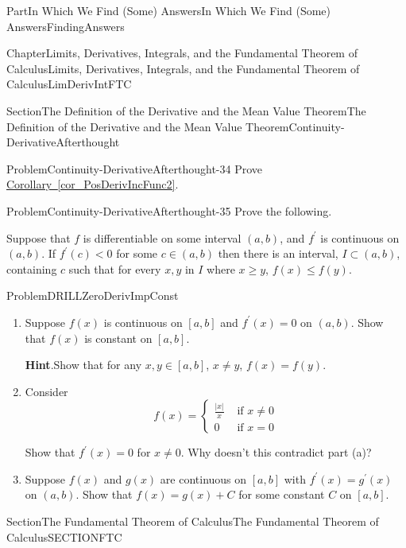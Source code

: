 \documentclass[oneside,10pt,]{book}
\newcommand{\blocktitlefont}{\relax}
\newcommand{\xreffont}{\relax}
\numberwithin{equation}{part}
\newcommand{\abs}[1]{\left|#1\right|}
\newcommand{\lt}{<}
\newcommand{\amp}{&}
\begin{document}
\begin{partptx}{Part}{In Which We Find (Some) Answers}{}{In Which We Find (Some) Answers}{}{}{FindingAnswers}
\begin{chapterptx}{Chapter}{Limits, Derivatives, Integrals, and the Fundamental Theorem of Calculus}{}{Limits, Derivatives, Integrals, and the Fundamental Theorem of Calculus}{}{}{LimDerivIntFTC}
\begin{sectionptx}{Section}{The Definition of  the Derivative and the Mean Value Theorem}{}{The Definition of  the Derivative and the Mean Value Theorem}{}{}{Continuity-DerivativeAfterthought}
\begin{problem}{Problem}{}{Continuity-DerivativeAfterthought-34}%
Prove \hyperref[cor_PosDerivIncFunc2]{Corollary~{\xreffont\ref{cor_PosDerivIncFunc2}}}.%
\end{problem}
\begin{problem}{Problem}{}{Continuity-DerivativeAfterthought-35}%
Prove the following.%
\par
Suppose that \(f\) is differentiable on some interval \((a,b)\), and \(f^\prime \) is continuous on \((a,b)\). If \(f^\prime(c)\lt 0\) for some \(c\in
(a,b)\) then there is an interval, \(I\subset (a,b)\), containing \(c\) such that for every \(x, y\) in \(I\) where \(x\ge y\), \(f(x)\le f(y)\).%
\end{problem}
\begin{problem}{Problem}{}{DRILLZeroDerivImpConst}%
\begin{enumerate}[font=\bfseries,label=(\alph*),ref=\alph*]%
\item{}Suppose \(f(x)\) is continuous on \([a,b]\) and \(f^\prime(x)=0\) on \((a,b)\).  Show that \(f(x)\) is constant on \([a,b]\).%
\par\smallskip%
\noindent\textbf{\blocktitlefont Hint}.\hypertarget{DRILLZeroDerivImpConst-1-2}{}\quad{}Show that for any \(x, y\in [a,b]\), \(x\neq y\), \(f(x)=f(y)\).%
\item{}Consider%
\begin{equation*}
f(x)=
\begin{cases}
\frac{\abs{x} }{x}\amp \text{ if } x\neq 0\\
0\amp \text{ if } x=0
\end{cases}
\end{equation*}
\par
Show that \(f^\prime(x)=0\) for \(x\neq 0\).  Why doesn't this contradict part (a)?%
\item{}Suppose \(f(x)\) and \(g(x)\) are continuous on \([a,b]\) with \(f^\prime(x)=g^\prime(x)\) on \((a,b)\).  Show that \(f(x)=g(x)+C\) for some constant \(C\) on \([a,b]\).%
\end{enumerate}%
\end{problem}
\end{sectionptx}
%
%
\typeout{************************************************}
\typeout{************************************************}
%
\begin{sectionptx}{Section}{The Fundamental Theorem of Calculus}{}{The Fundamental Theorem of Calculus}{}{}{SECTIONFTC}

\end{sectionptx}
\end{chapterptx}
\end{partptx}
\end{document}
